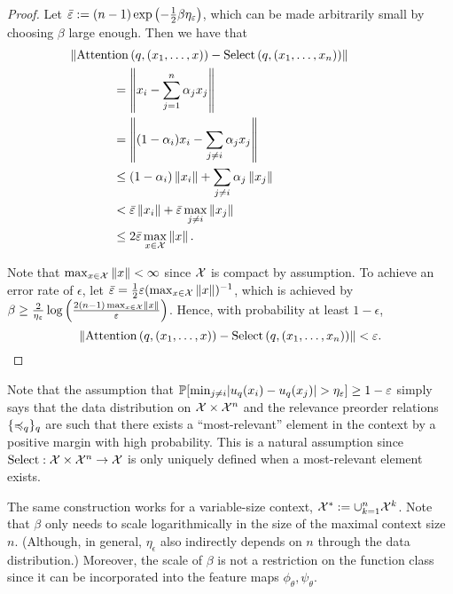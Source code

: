 \begin{proof}
    Let $\bar{\varepsilon} := (n-1) \exp\left(- \frac{1}{2} \beta \eta_{\varepsilon}\right)$, which can be made arbitrarily small by choosing $\beta$ large enough. Then we have that
    \begin{align*}
        &\hskip-.5in\norm{\mathrm{Attention}\paren{q, (x_1, \ldots, x)} - \mathrm{Select}\paren{q, (x_1, \ldots, x_n)}} \\
        &= \norm{x_i - \sum_{j=1}^n{\alpha_j} x_j} \\
        &= \norm{(1 - \alpha_i) x_i - \sum_{j\neq i} {\alpha_j} x_j} \\
        &\leq (1 - \alpha_i)  \norm{x_i} + \sum_{j \neq i} \alpha_j \norm{x_j}\\
        &< \bar{\epsilon} \norm{x_i} + \bar{\epsilon}     \max_{j \neq i}\norm{x_j} \\
        &\leq 2 \bar{\epsilon} \max_{x \in \calX} \norm{x}.
    \end{align*}

    Note that $\max_{x \in {\mathcal{X}}} \left\lVert x\right\rVert < \infty$ since ${\mathcal{X}}$ is compact by assumption. To achieve an error rate of $\epsilon$, let $\bar{\varepsilon} = \frac{1}{2} \varepsilon (\max_{x \in {\mathcal{X}}} \left\lVert x\right\rVert)^{-1}$, which is achieved by $\beta \geq \frac{2}{\eta_\varepsilon} \log\left(\frac{2 (n-1) \max_{x \in {\mathcal{X}}} \left\lVert x\right\rVert}{\varepsilon}\right)$. Hence, with probability at least $1 - \epsilon$,
    \begin{equation*}
        \left\lVert\mathrm{Attention}\left(q, (x_1, \ldots, x)\right) - \mathrm{Select}\left(q, (x_1, \ldots, x_n)\right)\right\rVert < \varepsilon.
    \end{equation*}
\end{proof}

\begin{remark}
    Note that the assumption that $\mathbb{P}[\min_{j \neq i} \lvert u_q(x_i) - u_q(x_j)\rvert > \eta_\varepsilon] \geq 1 - \varepsilon$ simply says that the data distribution on ${\mathcal{X}} \times {\mathcal{X}}^n$ and the relevance preorder relations $\{\preccurlyeq_q\}_q$ are such that there exists a ``most-relevant'' element in the context by a positive margin with high probability. This is a natural assumption since $\mathrm{Select}: {\mathcal{X}} \times {\mathcal{X}}^n \to {\mathcal{X}}$ is only uniquely defined when a most-relevant element exists.
\end{remark}

\begin{remark}
    The same construction works for a variable-size context, ${\mathcal{X}}^* := \cup_{k=1}^n {\mathcal{X}}^k$. Note that $\beta$ only needs to scale logarithmically in the size of the maximal context size $n$. (Although, in general, $\eta_\epsilon$ also indirectly depends on $n$ through the data distribution.) Moreover, the scale of $\beta$ is not a restriction on the function class since it can be incorporated into the feature maps $\phi_\theta, \psi_\theta$.
\end{remark}

